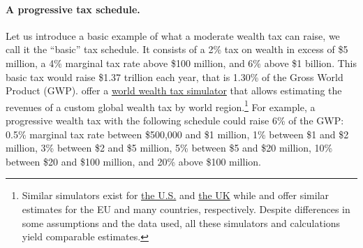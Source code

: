 \documentclass[12pt,english]{article}
\begin{document}
\paragraph{A progressive tax schedule.} %
Let us introduce a basic example of what a moderate wealth tax can raise, we call it the ``basic'' tax schedule. It consists of a 2\% tax on wealth in excess of \$5 million, a 4\% marginal tax rate above \$100 million, and 6\% above \$1 billion. This basic tax would raise \$1.37 trillion each year, that is 1.30\% of the Gross World Product (GWP). %
\citet{chancel_world_2022} offer a \href{https://wid.world/world-wealth-tax-simulator/}{world wealth tax simulator} that allows estimating the revenues of a custom global wealth tax by world region.\footnote{Similar simulators exist for \href{https://taxjusticenow.org/}{the U.S.} \citep{saez_triumph_2019} and \href{http://taxsimulator.ukwealth.tax/\#/appendix}{the UK} while \citet{kapeller_european_2021} and \citet{oxfam_taxing_2022} offer similar estimates for the EU and many countries, respectively. Despite differences in some assumptions and the data used, all these simulators and calculations yield comparable estimates.} 
For example, a progressive wealth tax with the following schedule could raise 6\% of the GWP: 0.5\% marginal tax rate between \$500,000 and \$1 million, 1\% between \$1 and \$2 million, 3\% between \$2 and \$5 million, 5\% between \$5 and \$20 million, 10\% between \$20 and \$100 million, and 20\% above \$100 million. %
\end{document}
